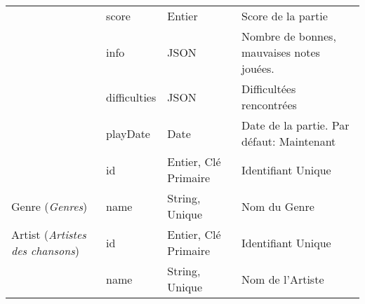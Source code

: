 \begin{longtable}[c]{@{}|p{}|p{}|p{}|p{}|@{}}
														& score                                                & Entier                                                                                   & Score de la partie                                                                       \\* \cline{2-4} 
														& info                                                 & JSON                                                                                     & Nombre de bonnes, mauvaises notes jouées.                                                \\* \cline{2-4} 
														& difficulties                                         & JSON                                                                                     & Difficultées rencontrées                                                                 \\* \cline{2-4} 
								                        & playDate                                             & Date                                                                                     & Date de la partie. Par défaut: Maintenant                                                \\* \hline
														& id                                                   & Entier, Clé Primaire                                                                     & Identifiant Unique                                                                       \\* \cline{2-4} 
	\multirow{-2}{0.18\textwidth}{Genre (\textit{Genres})}                             & name                                                 & String, Unique                                                                           & Nom du Genre                                                                             \\* \hline
	\multirow{-1}{0.18\textwidth}{Artist (\textit{Artistes des chansons})}							& id                                                   & Entier, Clé Primaire                                                                     & Identifiant Unique                                                                       \\* \cline{2-4} 
								                            & name                                                 & String, Unique                                                                           & Nom de l’Artiste                                                                         \\* \hline

\end{longtable}
